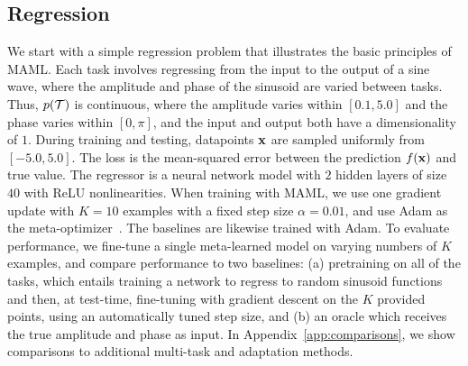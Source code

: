 \documentclass{article}
\begin{document}

\subsection{Regression} 

We start with a simple regression problem that illustrates the basic principles of MAML. Each task involves regressing from the input to the output of a sine wave, where the amplitude and phase of the sinusoid are varied between tasks. Thus, $p(\mathcal{T})$ is continuous, where the amplitude varies within $[0.1,5.0]$ and the phase varies within $[0,\pi]$, and the input and output both have a dimensionality of $1$. During training and testing, datapoints $\mathbf{x}$ are sampled uniformly from $[-5.0,5.0]$. The loss is the mean-squared error between the prediction $f(\mathbf{x})$ and true value. The regressor is a neural network model with $2$ hidden layers of size $40$ with ReLU nonlinearities. When training with MAML, we use one gradient update with $K=10$ examples with a fixed step size $\alpha=0.01$, and use Adam  as the meta-optimizer~\cite{adam}. The baselines are likewise trained with Adam. To evaluate performance, we fine-tune a single meta-learned model on varying numbers of $K$ examples, and compare performance to two baselines: (a) pretraining on all of the tasks, which entails training a network to regress to random sinusoid functions and then, at test-time, fine-tuning with gradient descent on the $K$ provided points, using an automatically tuned step size, and (b) an oracle which receives the true amplitude and phase as input. In Appendix~\ref{app:comparisons}, we show comparisons to additional multi-task and adaptation methods.
\end{document}
